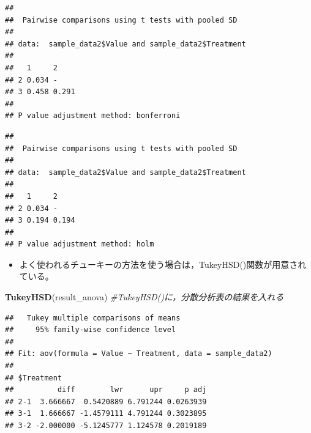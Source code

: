 \documentclass[]{article}
\newenvironment{Shaded}{\begin{snugshade}}{\end{snugshade}}
\newcommand{\KeywordTok}[1]{\textcolor[rgb]{0.13,0.29,0.53}{\textbf{#1}}}
\newcommand{\DataTypeTok}[1]{\textcolor[rgb]{0.13,0.29,0.53}{#1}}
\newcommand{\StringTok}[1]{\textcolor[rgb]{0.31,0.60,0.02}{#1}}
\newcommand{\CommentTok}[1]{\textcolor[rgb]{0.56,0.35,0.01}{\textit{#1}}}
\newcommand{\OperatorTok}[1]{\textcolor[rgb]{0.81,0.36,0.00}{\textbf{#1}}}
\newcommand{\NormalTok}[1]{#1}
\providecommand{\tightlist}{%
  \setlength{\itemsep}{0pt}\setlength{\parskip}{0pt}}
\begin{document}
\begin{Shaded}
\end{Shaded}

\begin{verbatim}
## 
##  Pairwise comparisons using t tests with pooled SD 
## 
## data:  sample_data2$Value and sample_data2$Treatment 
## 
##   1     2    
## 2 0.034 -    
## 3 0.458 0.291
## 
## P value adjustment method: bonferroni
\end{verbatim}

\begin{Shaded}
\end{Shaded}

\begin{verbatim}
## 
##  Pairwise comparisons using t tests with pooled SD 
## 
## data:  sample_data2$Value and sample_data2$Treatment 
## 
##   1     2    
## 2 0.034 -    
## 3 0.194 0.194
## 
## P value adjustment method: holm
\end{verbatim}

\begin{itemize}
\tightlist
\item
  よく使われるチューキーの方法を使う場合は，TukeyHSD()関数が用意されている。
\end{itemize}

\begin{Shaded}
\begin{Highlighting}[]
\KeywordTok{TukeyHSD}\NormalTok{(result_anova) }\CommentTok{#TukeyHSD()に，分散分析表の結果を入れる}
\end{Highlighting}
\end{Shaded}

\begin{verbatim}
##   Tukey multiple comparisons of means
##     95% family-wise confidence level
## 
## Fit: aov(formula = Value ~ Treatment, data = sample_data2)
## 
## $Treatment
##          diff        lwr      upr     p adj
## 2-1  3.666667  0.5420889 6.791244 0.0263939
## 3-1  1.666667 -1.4579111 4.791244 0.3023895
## 3-2 -2.000000 -5.1245777 1.124578 0.2019189
\end{verbatim}
\end{document}
